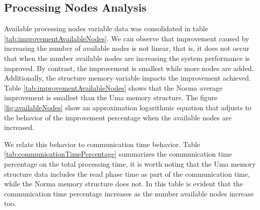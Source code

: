 \subsection{Processing Nodes Analysis}
\label{subsec:processingNodesAnalysis}
Available processing nodes variable data was consolidated in table \ref{tab:improvementAvailableNodes}. We can observe that improvement caused by increasing the number of available nodes is not linear, that is, it does not occur that when the number available nodes are increasing the system performance is improved. By contrast, the improvement is smallest while more nodes are added. Additionally, the structure memory variable impacts the improvement achieved. Table \ref{tab:improvementAvailableNodes} shows that the Norma average improvement is smallest than the Uma memory structure. The figure \ref{fig:availableNodes} show an approximation logarithmic equation that adjusts to the behavior of the improvement percentage when the available nodes are increased.

We relate this behavior to communication time behavior. Table \ref{tab:communicationTimePercentage} summarizes the communication time percentage on the total processing time, it is worth noting that the Uma memory structure data includes the read phase time as part of the communication time, while the Norma memory structure does not. In this table is evident that the communication time percentage increases as the number available nodes increase too. 

